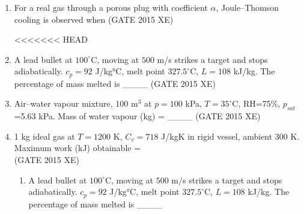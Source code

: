 \documentclass[journal,12pt,onecolumn]{IEEEtran}
\begin{document}
\begin{enumerate}
\begin{enumerate}
\begin{enumerate}
\item For a real gas through a porous plug with coefficient $\alpha$, Joule–Thomson cooling is observed when
\hfill{(GATE 2015 XE)} \\
\begin{multicols}{4}
<<<<<<< HEAD
\end{multicols}

\item A lead bullet at $100^\circ$C, moving at $500$ m/s strikes a target and stops adiabatically. $c_p=92$ J/kg°C, melt point $327.5^\circ$C, $L=108$ kJ/kg. The percentage of mass melted is \_\_\_\_
\hfill{(GATE 2015 XE)} \\



\item Air–water vapour mixture, 100 m$^3$ at $p=100$ kPa, $T=35^\circ$C, RH=75\%, $p_{sat}$=5.63 kPa. Mass of water vapour (kg) = \_\_\_\_
\hfill{(GATE 2015 XE)} \\


\item 1 kg ideal gas at $T=1200$ K, $C_v=718$ J/kgK in rigid vessel, ambient 300 K. Maximum work (kJ) obtainable =  \\
\hfill{(GATE 2015 XE)} 
\begin{multicols}{4}
\begin{enumerate}
=======
\vspace{0.5cm}

\item A lead bullet at $100^\circ$C, moving at $500$ m/s strikes a target and stops adiabatically. $c_p=92$ J/kg°C, melt point $327.5^\circ$C, $L=108$ kJ/kg. The percentage of mass melted is \_\_\_\_
\hfill{} \\


\end{enumerate}
\end{multicols}
\end{enumerate}
\end{enumerate}
\end{enumerate}
\end{document}

